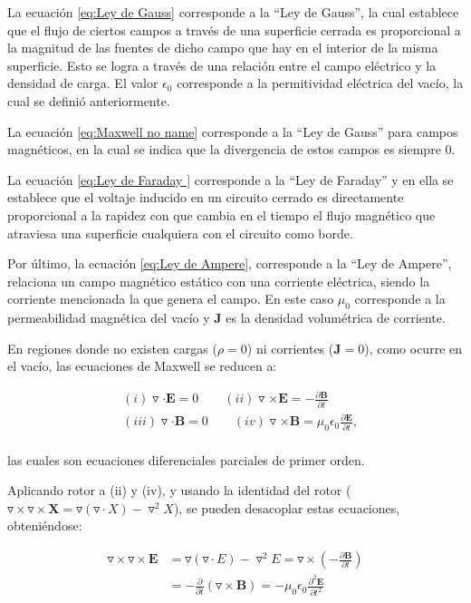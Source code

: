\documentclass[12pt,letterpaper]{report}
\numberwithin{equation}{section}
\begin{document}
La ecuación \ref{eq:Ley de Gauss} corresponde a la ``Ley de Gauss'', la cual establece que el flujo de ciertos campos a través de una superficie cerrada es proporcional a la magnitud de las fuentes de dicho campo que hay en el interior de la misma superficie. Esto se logra a través de una relación entre el campo eléctrico y la densidad de carga. El valor $\epsilon_0$ corresponde a la permitividad eléctrica del vacío, la cual se definió anteriormente.

La ecuación \ref{eq:Maxwell no name} corresponde a la ``Ley de Gauss'' para campos magnéticos, en la cual se indica que la divergencia de estos campos es siempre 0.

La ecuación \ref{eq:Ley de Faraday } corresponde a la ``Ley de Faraday'' y en ella se establece que el voltaje inducido en un circuito cerrado es directamente proporcional a la rapidez con que cambia en el tiempo el flujo magnético que atraviesa una superficie cualquiera con el circuito como borde.

Por último, la ecuación \ref{eq:Ley de Ampere}, corresponde a la ``Ley de Ampere'', relaciona un campo magnético estático con una corriente eléctrica, siendo la corriente mencionada la que genera el campo. En este caso $\mu_{0}$ corresponde a la permeabilidad magnética del vacío y \textbf{J} es la densidad volumétrica de corriente.

En regiones donde no existen cargas ($\rho = 0$) ni corrientes ($\textbf{J} = 0$), como ocurre en el vacío, las ecuaciones de Maxwell se reducen a:

\begin{equation}
\begin{split}
&(i)\triangledown\cdot\textbf{E} = 0\qquad(ii)\triangledown\times\textbf{E} = -\frac{\partial\textbf{B}}{\partial t}\\
&(iii)\triangledown\cdot\textbf{B} = 0\qquad(iv)\triangledown\times\textbf{B} = \mu_0\epsilon_0\frac{\partial\textbf{E}}{\partial t},
\end{split}
\label{eq: Maxwell_sin_cargas}
\end{equation}
\\
\noindent las cuales son ecuaciones diferenciales parciales de primer orden.
 
Aplicando rotor a (ii) y (iv), y usando la identidad del rotor ($\triangledown\times\triangledown\times\textbf{X}= \triangledown(\triangledown\cdot X)-\triangledown^2X$), se pueden desacoplar estas ecuaciones, obteniéndose:

\begin{equation*}
\begin{split}
\triangledown\times\triangledown\times\textbf{E} &= \triangledown(\triangledown\cdot E)-\triangledown^2E=\triangledown\times\left(-\frac{\partial \textbf{B}}{\partial t}\right)\\
&= -\frac{\partial}{\partial t}(\triangledown\times\textbf{B})=-\mu_0\epsilon_0\frac{\partial^2\textbf{E}}{\partial t^2}
\end{split}
\end{equation*}
\end{document}
